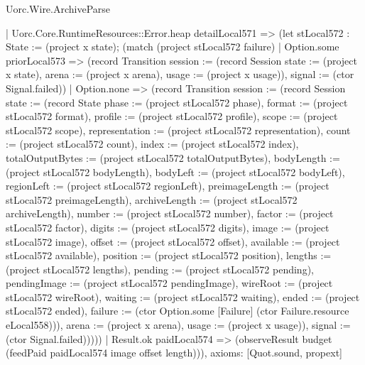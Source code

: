 \begin{lexlean}{Uorc.Wire.ArchiveParse}
\begin{semanticmodule}
{      | Uorc.Core.RuntimeResources::Error.heap detailLocal571 => (let stLocal572 : State := (project x state); (match (project stLocal572 failure)
        | Option.some priorLocal573 => (record Transition {session := (record Session {state := (project x state), arena := (project x arena), usage := (project x usage)}), signal := (ctor Signal.failed)})
        | Option.none => (record Transition {session := (record Session {state := (record State {phase := (project stLocal572 phase), format := (project stLocal572 format), profile := (project stLocal572 profile), scope := (project stLocal572 scope), representation := (project stLocal572 representation), count := (project stLocal572 count), index := (project stLocal572 index), totalOutputBytes := (project stLocal572 totalOutputBytes), bodyLength := (project stLocal572 bodyLength), bodyLeft := (project stLocal572 bodyLeft), regionLeft := (project stLocal572 regionLeft), preimageLength := (project stLocal572 preimageLength), archiveLength := (project stLocal572 archiveLength), number := (project stLocal572 number), factor := (project stLocal572 factor), digits := (project stLocal572 digits), image := (project stLocal572 image), offset := (project stLocal572 offset), available := (project stLocal572 available), position := (project stLocal572 position), lengths := (project stLocal572 lengths), pending := (project stLocal572 pending), pendingImage := (project stLocal572 pendingImage), wireRoot := (project stLocal572 wireRoot), waiting := (project stLocal572 waiting), ended := (project stLocal572 ended), failure := (ctor Option.some [Failure] (ctor Failure.resource eLocal558))}), arena := (project x arena), usage := (project x usage)}), signal := (ctor Signal.failed)}))))
    | Result.ok paidLocal574 => (observeResult budget (feedPaid paidLocal574 image offset length))),
  axioms: [Quot.sound, propext]
}


\end{semanticmodule}
\end{lexlean}
